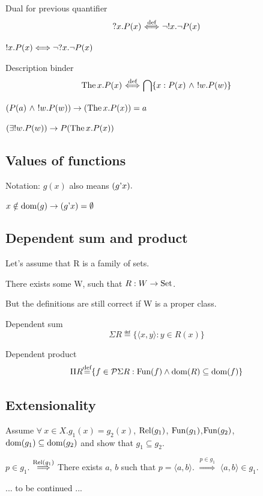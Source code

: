 \documentclass[10pt,a4paper]{article}
\begin{document}
\begin{definition}  Dual for previous quantifier 
$$?x. P(x) {\stackrel{{\textrm{def}}}{\ \Longleftrightarrow\ }} \neg !x. \neg P(x)$$
\end{definition}

\begin{exercise}
$!x. P(x) \Longleftrightarrow \neg ?x. \neg P(x)$
\end{exercise}

\begin{definition} Description binder
$${\textrm{The\,}} x. P(x) {\stackrel{{\textrm{def}}}{\ \Longleftrightarrow\ }} {\bigcap} \{x:P(x)\ \land\ !w.P(w)\}$$
\end{definition}

\begin{exercise}
$(P(a)\ \land\ !w.P(w)) \rightarrow ({\textrm{The\,}} x. P(x))=a$
\end{exercise}

\begin{exercise}
$(\exists !w.P(w)) \rightarrow P({\textrm{The\,}} x. P(x))$
\end{exercise}

\subsection{Values of functions}
Notation: $g(x)$ also means $(g{\textrm{'}} x).$


\begin{exercise}
$x\notin {\textrm{dom}}(g)\to (g{\textrm{'}} x)=\emptyset$
\end{exercise}

\subsection{Dependent sum and product}
Let's assume that R is a family of sets.

There exists some W, such that $R:W\to{\textrm{Set}}$.

But the definitions are still correct if W is a proper class.

\begin{definition} Dependent sum
$$\Sigma R\eqdef\{\langle x, y\rangle: y\in R(x)\}$$
\end{definition}
\begin{definition} Dependent product
$$\Pi R{\stackrel{{\textrm{def}}}{=}}\{ f\in {\mathcal{P}}\Sigma R: {\textrm{Fun}}(f)\land {\textrm{dom}}(R)\subseteq {\textrm{dom}}(f)\}$$
\end{definition}

\subsection{Extensionality}
\begin{theorem}
Assume $\forall~x\in X. g_1(x)=g_2(x)$, ${\textrm{Rel}}(g_1)$, ${\textrm{Fun}}(g_1)$,${\textrm{Fun}}(g_2)$,
 ${\textrm{dom}}(g_1)\subseteq{\textrm{dom}}(g_2)$ and show that $g_1\subseteq g_2$.

\myprf

$p\in g_1$.
$\stackrel{{\textrm{Rel}}(g_1)}{\Longrightarrow}$
There exists $a$, $b$ such that $p=\langle a, b\rangle$.
$\stackrel{p\in g_1}{\Longrightarrow}$ $\langle a, b\rangle\in g_1$.


... to be continued ...

\myqed 
\end{theorem}
\end{document}
